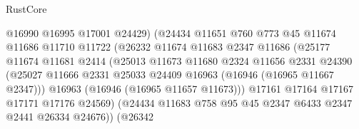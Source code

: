 \begin{lexlean}{RustCore}
\begin{coremodule}
                                    @16990
                                    @16995
                                    @17001
                                    @24429)
                                  (@24434
                                    @11651
                                    @760
                                    @773
                                    @45
                                    @11674
                                    @11686
                                    @11710
                                    @11722
                                    (@26232
                                      @11674
                                      @11683
                                      @2347
                                      @11686
                                      (@25177
                                        @11674
                                        @11681
                                        @2414
                                        (@25013
                                          @11673
                                          @11680
                                          @2324
                                          @11656
                                          @2331
                                          @24390
                                          (@25027
                                            @11666
                                            @2331
                                            @25033
                                            @24409
                                            @16963
                                            (@16946 (@16965 @11667 @2347)))
                                          @16963
                                          (@16946 (@16965 @11657 @11673)))
                                        @17161
                                        @17164
                                        @17167
                                        @17171
                                        @17176
                                        @24569)
                                      (@24434
                                        @11683
                                        @758
                                        @95
                                        @45
                                        @2347
                                        @6433
                                        @2347
                                        @2441
                                        @26334
                                        @24676))
                                    (@26342

\end{coremodule}
\end{lexlean}
